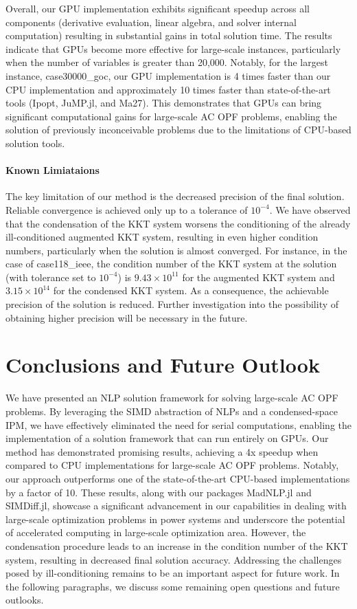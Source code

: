 Overall, our GPU implementation exhibits significant speedup across
all components (derivative evaluation, linear algebra, and solver
internal computation) resulting in substantial gains in total solution
time. The results indicate that GPUs become more effective for
large-scale instances, particularly when the number of variables is
greater than 20,000. Notably, for the largest instance,
case30000\_goc, our GPU implementation is 4 times faster than our CPU
implementation and approximately 10 times faster than
state-of-the-art tools (Ipopt, JuMP.jl, and Ma27).
This demonstrates that GPUs can bring significant computational
gains for large-scale AC OPF problems, enabling the solution of
previously inconceivable problems due to the limitations of CPU-based
solution tools.

\paragraph*{Known Limiataions}
The key limitation of our method is the decreased precision of the
final solution. Reliable convergence is achieved only up to a
tolerance of $10^{-4}$. We have observed that the condensation of the
KKT system worsens the conditioning of the already ill-conditioned
augmented KKT system, resulting in even higher condition numbers,
particularly when the solution is almost converged. For instance, in
the case of case118\_ieee, the condition number of the KKT system at
the solution (with tolerance set to $10^{-4}$) is $9.43\times 10^{11}$
for the augmented KKT system and $3.15\times 10^{14}$ for the
condensed KKT system. As a consequence, the achievable precision of
the solution is reduced. Further investigation into the possibility of
obtaining higher precision will be necessary in the future.

\section{Conclusions and Future Outlook}\label{sec:conc}
We have presented an NLP solution framework for solving large-scale AC
OPF problems. By leveraging the SIMD abstraction of NLPs and a
condensed-space IPM, we have effectively eliminated the need for
serial computations, enabling the implementation of a solution
framework that can run entirely on GPUs. Our method has demonstrated
promising results, achieving a 4x speedup when compared to CPU
implementations for large-scale AC OPF problems. Notably, our approach
outperforms one of the state-of-the-art CPU-based implementations by
a factor of 10. These results, along with our packages
MadNLP.jl and SIMDiff.jl, showcase a significant advancement in our
capabilities in dealing with large-scale optimization problems in
power systems and underscore the potential of accelerated computing in
large-scale optimization area. However, the condensation procedure
leads to an increase in the condition number of the KKT system,
resulting in decreased final solution accuracy. Addressing the
challenges posed by ill-conditioning remains to be an important aspect
for future work. In the following paragraphs, we discuss some
remaining open questions and future outlooks.

